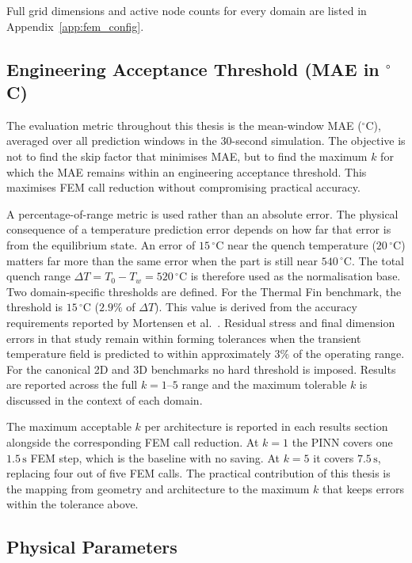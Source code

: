 Full grid dimensions and active node counts for every domain are listed in
Appendix~\ref{app:fem_config}.

\subsection{Engineering Acceptance Threshold (MAE in $^\circ$C)}
\label{subsec:threshold}

The evaluation metric throughout this thesis is the mean-window MAE
($^\circ\mathrm{C}$), averaged over all prediction windows in the 30-second
simulation.
The objective is not to find the skip factor that minimises MAE, but to find
the maximum $k$ for which the MAE remains within an engineering acceptance
threshold.
This maximises FEM call reduction without compromising practical accuracy.

A percentage-of-range metric is used rather than an absolute error.
The physical consequence of a temperature prediction error depends on how far
that error is from the equilibrium state.
An error of $15\,^\circ\mathrm{C}$ near the quench temperature
($20\,^\circ\mathrm{C}$) matters far more than the same error when the part is
still near $540\,^\circ\mathrm{C}$.
The total quench range $\Delta T = T_0 - T_w = 520\,^\circ\mathrm{C}$ is
therefore used as the normalisation base.
Two domain-specific thresholds are defined.
For the Thermal Fin benchmark, the threshold is $15\,^\circ\mathrm{C}$
($2.9\%$ of $\Delta T$).
This value is derived from the accuracy requirements reported by
Mortensen et al.~\cite{mortensen2026}.
Residual stress and final dimension errors in that study remain within
forming tolerances when the transient temperature field is predicted to
within approximately $3\%$ of the operating range.
For the canonical 2D and 3D benchmarks no hard threshold is imposed.
Results are reported across the full $k=1$--$5$ range and the maximum
tolerable $k$ is discussed in the context of each domain.

The maximum acceptable $k$ per architecture is reported in each results
section alongside the corresponding FEM call reduction.
At $k=1$ the PINN covers one $1.5\,\mathrm{s}$ FEM step, which is the
baseline with no saving.
At $k=5$ it covers $7.5\,\mathrm{s}$, replacing four out of five FEM calls.
The practical contribution of this thesis is the mapping from geometry and
architecture to the maximum $k$ that keeps errors within the tolerance above.

\subsection{Physical Parameters}

